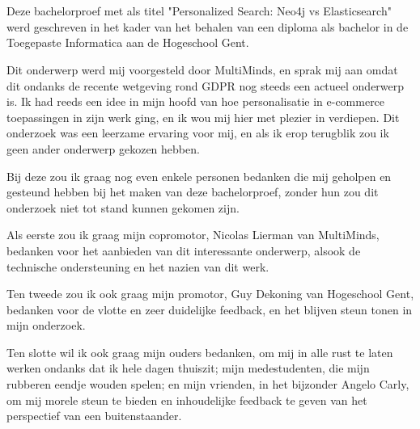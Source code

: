 
\chapter*{}
\label{ch:voorwoord}


Deze bachelorproef met als titel "Personalized Search: Neo4j vs Elasticsearch" werd geschreven in het kader van het behalen van een diploma als bachelor in de Toegepaste Informatica aan de Hogeschool Gent.

Dit onderwerp werd mij voorgesteld door MultiMinds, en sprak mij aan omdat dit ondanks de recente wetgeving rond GDPR nog steeds een actueel onderwerp is. Ik had reeds een idee in mijn hoofd  van hoe personalisatie in e-commerce toepassingen in zijn werk ging, en ik wou mij hier met plezier in verdiepen. Dit onderzoek was een leerzame ervaring voor mij, en als ik erop terugblik zou ik geen ander onderwerp gekozen hebben. 

Bij deze zou ik graag nog even enkele personen bedanken die mij geholpen en gesteund hebben bij het maken van deze bachelorproef, zonder hun zou dit onderzoek niet tot stand kunnen gekomen zijn.

Als eerste zou ik graag mijn copromotor, Nicolas Lierman van MultiMinds, bedanken voor het aanbieden van dit interessante onderwerp, alsook de technische ondersteuning en het nazien van dit werk.

Ten tweede zou ik ook graag mijn promotor, Guy Dekoning van Hogeschool Gent, bedanken voor de vlotte en zeer duidelijke feedback, en het blijven steun tonen in mijn onderzoek. 

Ten slotte wil ik ook graag mijn ouders bedanken, om mij in alle rust te laten werken ondanks dat ik hele dagen thuiszit; mijn medestudenten, die mijn rubberen eendje wouden spelen; en mijn vrienden, in het bijzonder Angelo Carly, om mij morele steun te bieden en inhoudelijke feedback te geven van het perspectief van een buitenstaander.


